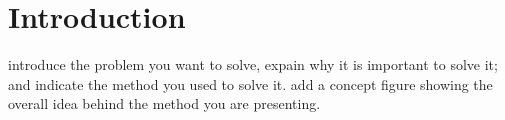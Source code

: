 \section{Introduction}
introduce the problem you want to solve, expain why it is important to solve it; and indicate the method you used to solve it. add a concept figure showing the overall idea behind the method you are presenting.
